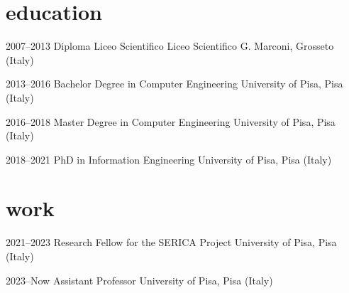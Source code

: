 \documentclass[]{style}
\begin{document}
\section{education}

\begin{entrylist}

\entry
{2007--2013}
{Diploma {\normalfont Liceo Scientifico}}
{Liceo Scientifico G. Marconi, Grosseto (Italy)}

\entry
{2013--2016}
{Bachelor Degree {\normalfont in Computer Engineering}}
{University of Pisa, Pisa (Italy)}

\entry
{2016--2018}
{Master Degree {\normalfont in Computer Engineering}}
{University of Pisa, Pisa (Italy)}

\entry
{2018--2021}
{PhD {\normalfont in Information Engineering}}
{University of Pisa, Pisa (Italy)}

\end{entrylist}

\section{work}
\begin{entrylist}
\entry
{2021--2023}
{Research Fellow {\normalfont for the SERICA Project}}
{University of Pisa, Pisa (Italy)}

\entry
{2023--Now}
{Assistant Professor}
{University of Pisa, Pisa (Italy)}

\end{entrylist}
\end{document}
